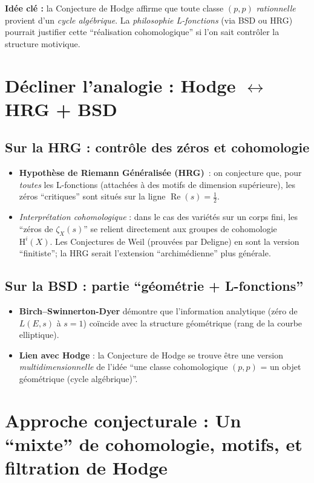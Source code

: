 \documentclass[11pt]{article}
\begin{document}
\noindent
\textbf{Idée clé :} la Conjecture de Hodge affirme que toute classe \((p,p)\) \emph{rationnelle} provient d'un \emph{cycle algébrique}. La \emph{philosophie L-fonctions} (via BSD ou HRG) pourrait justifier cette “réalisation cohomologique” si l'on sait contrôler la structure motivique.

\section{Décliner l'analogie : Hodge \texorpdfstring{$\leftrightarrow$}{} HRG + BSD}

\subsection{Sur la HRG : contrôle des zéros et cohomologie}

\begin{itemize}
  \item \textbf{Hypothèse de Riemann Généralisée (HRG)}~: on conjecture que, pour \emph{toutes} les L-fonctions (attachées à des motifs de dimension supérieure), les zéros “critiques” sont situés sur la ligne $\operatorname{Re}(s)=\tfrac12$. 
  \item \emph{Interprétation cohomologique} : dans le cas des variétés sur un corps fini, les “zéros de $\zeta_X(s)$” se relient directement aux groupes de cohomologie $\mathrm{H}^i(X)$. Les Conjectures de Weil (prouvées par Deligne) en sont la version “finitiste”; la HRG serait l'extension “archimédienne” plus générale.
\end{itemize}

\subsection{Sur la BSD : partie “géométrie + L-fonctions”}

\begin{itemize}
  \item \textbf{Birch--Swinnerton-Dyer} démontre que l'information analytique (zéro de $L(E,s)$ à $s=1$) coïncide avec la structure géométrique (rang de la courbe elliptique). 
  \item \textbf{Lien avec Hodge} : la Conjecture de Hodge se trouve être une version \emph{multidimensionnelle} de l'idée “une classe cohomologique \((p,p)\) = un objet géométrique (cycle algébrique)”. 
\end{itemize}

\section{Approche conjecturale : Un “mixte” de cohomologie, motifs, et filtration de Hodge}
\end{document}
